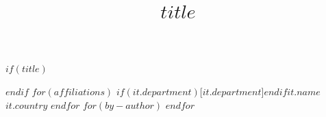 $if(title)$
\title{$title$}
$endif$
$for(affiliations)$
$if(it.department)$[$it.department$]$endif${$it.name$}{$it.country$}
$endfor$
$for(by-author)$
$endfor$
